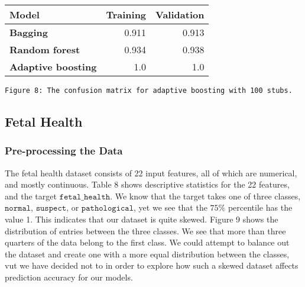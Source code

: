 \documentclass[11pt]{article}
\begin{document}
\begin{table}[h!]
	\begin{center}
		\label{tab:table1}
		\begin{tabular}{l|r|r}
			\textbf{Model}                                                 	& \textbf{Training} & \textbf{Validation}
			\\ \hline
			\textbf{Bagging}                             		             & 0.911        & 0.913              \\ \hline
			\textbf{Random forest}                                		     & 0.934        & 0.938              \\ \hline
			\textbf{Adaptive boosting}   							    	 & 1.0          & 1.0                \\ \hline
		\end{tabular}
	\end{center}
\end{table}

\begin{center}
\end{center}
\begin{Verbatim}[commandchars=\\\{\}]
	Figure 8: The confusion matrix for adaptive boosting with 100 stubs.
\end{Verbatim}


    \hypertarget{fetal-health}{%
\subsection{Fetal Health}\label{fetal-health}}

\hypertarget{pre-processing-the-data2}{%
	\subsubsection{Pre-processing the Data}\label{pre-processing-the-data2}}
The fetal health dataset consists of 22 input features, all of which are numerical, and mostly continuous. Table 8 shows descriptive statistics for the 22 features, and the target $\texttt{fetal\_health}$. We know that the target takes one of three classes, $\texttt{normal}$, $\texttt{suspect}$, or $\texttt{pathological}$, yet we see that the $75\%$ percentile has the value 1. This indicates that our dataset is quite skewed. 
Figure 9 shows the distribution of entries between the three classes. We see that more than three quarters of the data belong to the first class. We could attempt to balance out the dataset and create one with a more equal distribution between the classes, vut we have decided not to in order to explore how such a skewed dataset affects prediction accuracy for our models.
\end{document}
